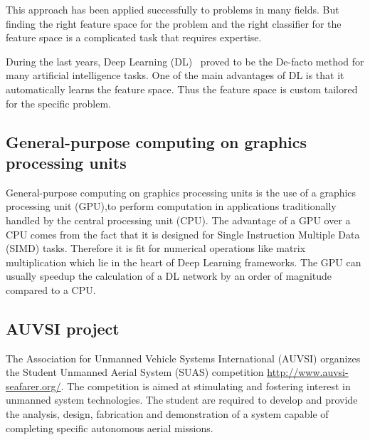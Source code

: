 \documentclass{article} %
\begin{document}
This approach has been applied successfully to problems in many fields. But
finding the right
feature space for the problem and the right classifier for the feature space is
a complicated task that requires expertise.

During the last years, Deep Learning (DL)~\cite{Bengio2009, LeCun2015} proved to be the De-facto method for
many artificial intelligence tasks. One of the main advantages of DL is that
it automatically learns the feature space. Thus the feature space is custom
tailored for the specific problem.

\subsection{General-purpose computing on graphics processing units}

General-purpose computing on graphics processing units is the use of a
graphics processing unit (GPU),to perform computation in applications traditionally
handled by the central processing unit (CPU). The advantage of a GPU over a
CPU comes from the fact that it is designed for Single Instruction Multiple Data (SIMD) tasks.
Therefore it is fit for numerical operations like matrix multiplication
which lie in the heart of Deep Learning frameworks. The GPU can usually speedup
the calculation of a DL network by an order of magnitude compared to a CPU.

\subsection{AUVSI project}

The Association for Unmanned Vehicle Systems International (AUVSI)
organizes the Student Unmanned Aerial System (SUAS) competition
\url{http://www.auvsi-seafarer.org/}. The competition is aimed  at
stimulating and fostering interest in unmanned system technologies.
The  student  are required  to  develop  and  provide  the  analysis,
design, fabrication and demonstration of a system capable of completing
specific autonomous aerial missions.
\end{document}
